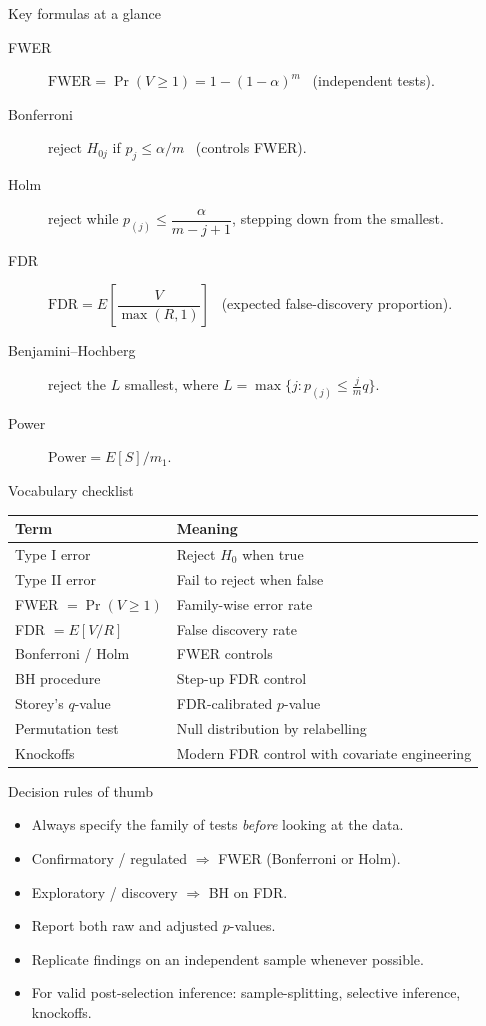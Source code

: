 \documentclass[aspectratio=169,11pt]{beamer}
\begin{document}
\begin{frame}{Key formulas at a glance}
  \footnotesize
  \begin{description}
    \item[FWER] $\mathrm{FWER}=\Pr(V\ge 1)=1-(1-\alpha)^m$ \ (independent tests).
    \item[Bonferroni] reject $H_{0j}$ if $p_j\le \alpha/m$ \ (controls FWER).
    \item[Holm] reject while $p_{(j)}\le \dfrac{\alpha}{m-j+1}$, stepping down from the smallest.
    \item[FDR] $\mathrm{FDR}=E\!\left[\dfrac{V}{\max(R,1)}\right]$ \ (expected false-discovery proportion).
    \item[Benjamini--Hochberg] reject the $L$ smallest, where $L=\max\{j: p_{(j)}\le \tfrac{j}{m}q\}$.
    \item[Power] $\mathrm{Power}=E[S]/m_1$.
  \end{description}
\end{frame}

\begin{frame}{Vocabulary checklist}
  \footnotesize
  \begin{tabular}{ll}
    \toprule
    \textbf{Term} & \textbf{Meaning} \\
    \midrule
    Type I error & Reject $H_0$ when true \\
    Type II error & Fail to reject when false \\
    FWER $= \Pr(V \ge 1)$ & Family-wise error rate \\
    FDR $= E[V/R]$ & False discovery rate \\
    Bonferroni / Holm & FWER controls \\
    BH procedure & Step-up FDR control \\
    Storey's $q$-value & FDR-calibrated $p$-value \\
    Permutation test & Null distribution by relabelling \\
    Knockoffs & Modern FDR control with covariate engineering \\
    \bottomrule
  \end{tabular}
\end{frame}

\begin{frame}{Decision rules of thumb}
  \begin{itemize}
    \item Always specify the family of tests \emph{before} looking at
          the data.
    \item Confirmatory / regulated $\Rightarrow$ FWER (Bonferroni or
          Holm).
    \item Exploratory / discovery $\Rightarrow$ BH on FDR.
    \item Report both raw and adjusted $p$-values.
    \item Replicate findings on an independent sample whenever
          possible.
    \item For valid post-selection inference: sample-splitting,
          selective inference, knockoffs.
  \end{itemize}
\end{frame}
\end{document}
